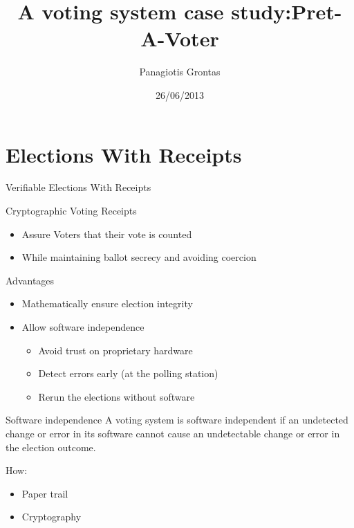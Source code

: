 \documentclass{beamer}
\title{A voting system case study:Pret-A-Voter}
\author{Panagiotis Grontas}
\date{26/06/2013}
\institute{$\mu\Pi\lambda\forall$  - CoReLab Crypto Group}
\begin{document}
\begin{frame}
\titlepage
\end{frame}

\section*{Elections With Receipts}

\begin{frame}[allowframebreaks]{Verifiable Elections With Receipts}

\begin{block}{Cryptographic Voting Receipts}
\begin{itemize}
\item Assure Voters that their vote is counted
\item While maintaining ballot secrecy and avoiding coercion 
\end{itemize}
\end{block}

\begin{block}{Advantages}
\begin{itemize}
\item Mathematically ensure election integrity
\item Allow software independence \cite{rivest2008notion}
\begin{itemize} 
\item Avoid trust on proprietary hardware
\item Detect errors early (at the polling station)
\item Rerun the elections without software
\end{itemize}
\end{itemize}
\end{block}

\begin{block}{Software independence}
A voting system is software independent if an undetected change or error in its software cannot cause an undetectable change or error in the election outcome. 
\end{block}
How: 
\begin{itemize}
\item Paper trail
\item Cryptography
\end{itemize}

\end{frame}
\end{document}
